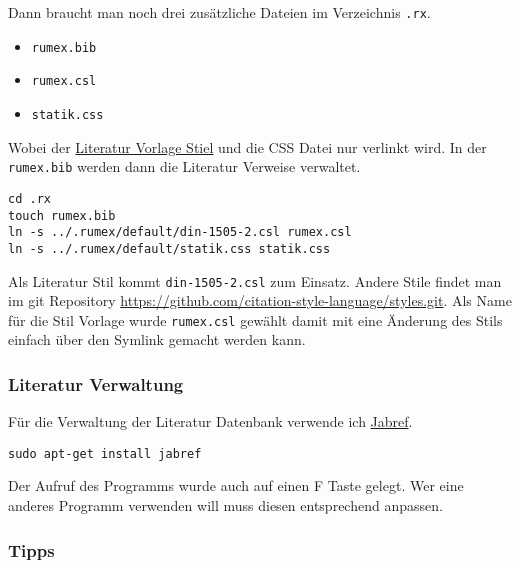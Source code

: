 Dann braucht man noch drei zusätzliche Dateien im Verzeichnis
\texttt{.rx}.

\begin{itemize}
\itemsep1pt\parskip0pt
\item
  \texttt{rumex.bib}
\item
  \texttt{rumex.csl}
\item
  \texttt{statik.css}
\end{itemize}

Wobei der \hyperref[literatur-stil]{Literatur Vorlage Stiel} und die CSS
Datei nur verlinkt wird. In der \texttt{rumex.bib} werden dann die
Literatur Verweise verwaltet.

\begin{verbatim}
cd .rx
touch rumex.bib
ln -s ../.rumex/default/din-1505-2.csl rumex.csl
ln -s ../.rumex/default/statik.css statik.css
\end{verbatim}


Als Literatur Stil kommt \texttt{din-1505-2.csl} zum Einsatz. Andere
Stile findet man im git Repository
\url{https://github.com/citation-style-language/styles.git}. Als Name
für die Stil Vorlage wurde \texttt{rumex.csl} gewählt damit mit eine
Änderung des Stils einfach über den Symlink gemacht werden kann.

\subsubsection{Literatur Verwaltung}\label{literatur-verwaltung}

Für die Verwaltung der Literatur Datenbank verwende ich
\href{http://jabref.sourceforge.net/}{Jabref}.

\begin{verbatim}
sudo apt-get install jabref
\end{verbatim}

Der Aufruf des Programms wurde auch auf einen F Taste gelegt. Wer eine
anderes Programm verwenden will muss diesen entsprechend anpassen.

\subsubsection{Tipps}\label{tipps}

